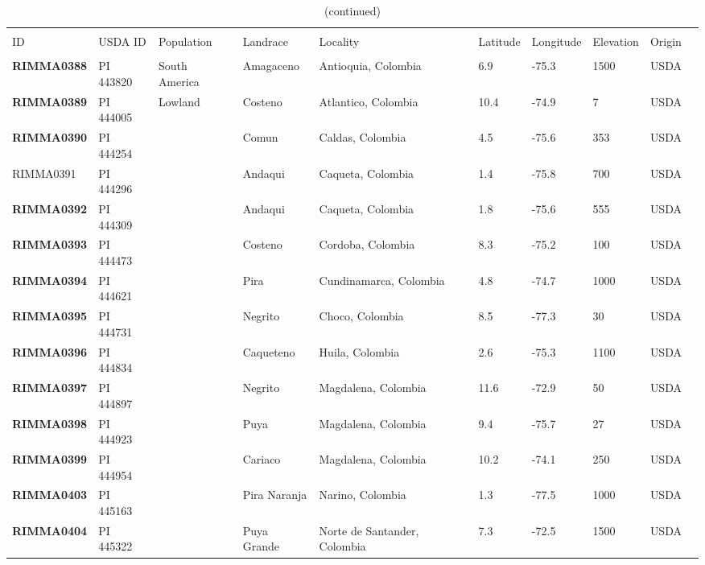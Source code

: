 \clearpage

\setcounter{table}{0}
\renewcommand{\arraystretch}{1.2}

\begin{table}[h]
    \begin{center}
    \caption[]{(continued)\hspace*{11.8cm}}  
{\fontsize{7}{10}\selectfont
    \begin{tabular}{llllllllll}
        \hline\hline
       & & & \\[-4mm] 
	 ID	&	USDA ID	&	Population	&	Landrace	&	Locality	&	Latitude	&	Longitude	&	Elevation	&	Origin	\\[0.0cm]
	\hline 
	& & & \\[-4mm] 
{\bf RIMMA0388}	&	PI 443820	&	South America	&	Amagaceno	&	Antioquia, Colombia	&	6.9 	&	-75.3 	&	1500	&	USDA	\\
{\bf RIMMA0389}	&	PI 444005	&	Lowland	&	Costeno	&	Atlantico, Colombia	&	10.4 	&	-74.9 	&	7	&	USDA	\\
{\bf RIMMA0390}	&	PI 444254	&		&	Comun	&	Caldas, Colombia	&	4.5 	&	-75.6 	&	353	&	USDA	\\
RIMMA0391	&	PI 444296	&		&	Andaqui	&	Caqueta, Colombia	&	1.4 	&	-75.8 	&	700	&	USDA	\\
{\bf RIMMA0392}	&	PI 444309	&		&	Andaqui	&	Caqueta, Colombia	&	1.8 	&	-75.6 	&	555	&	USDA	\\
{\bf RIMMA0393}	&	PI 444473	&		&	Costeno	&	Cordoba, Colombia	&	8.3 	&	-75.2 	&	100	&	USDA	\\
{\bf RIMMA0394}	&	PI 444621	&		&	Pira	&	Cundinamarca, Colombia	&	4.8 	&	-74.7 	&	1000	&	USDA	\\
{\bf RIMMA0395}	&	PI 444731	&		&	Negrito	&	Choco, Colombia	&	8.5 	&	-77.3 	&	30	&	USDA	\\
{\bf RIMMA0396}	&	PI 444834	&		&	Caqueteno	&	Huila, Colombia	&	2.6 	&	-75.3 	&	1100	&	USDA	\\
{\bf RIMMA0397}	&	PI 444897	&		&	Negrito	&	Magdalena, Colombia	&	11.6 	&	-72.9 	&	50	&	USDA	\\
{\bf RIMMA0398}	&	PI 444923	&		&	Puya	&	Magdalena, Colombia	&	9.4 	&	-75.7 	&	27	&	USDA	\\
{\bf RIMMA0399}	&	PI 444954	&		&	Cariaco	&	Magdalena, Colombia	&	10.2 	&	-74.1 	&	250	&	USDA	\\
{\bf RIMMA0403}	&	PI 445163	&		&	Pira Naranja	&	Narino, Colombia	&	1.3 	&	-77.5 	&	1000	&	USDA	\\
{\bf RIMMA0404}	&	PI 445322	&		&	Puya Grande	&	Norte de Santander, Colombia	&	7.3 	&	-72.5 	&	1500	&	USDA	\\

\end{tabular}}
\end{center}
\end{table}
